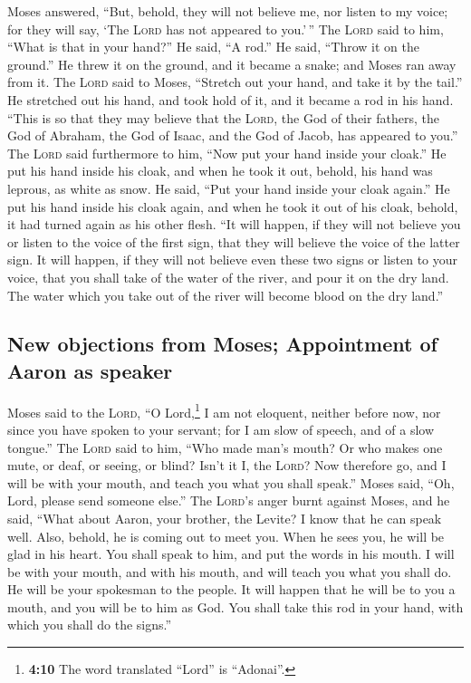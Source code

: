  Moses answered, ``But, behold, they will not believe me,
nor listen to my voice; for they will say, `The \textsc{Lord} has not
appeared to you.'\,''  The \textsc{Lord} said to him,
``What is that in your hand?'' He said, ``A rod.''  He
said, ``Throw it on the ground.'' He threw it on the ground, and it
became a snake; and Moses ran away from it.  The
\textsc{Lord} said to Moses, ``Stretch out your hand, and take it by the
tail.'' He stretched out his hand, and took hold of it, and it became a
rod in his hand.  ``This is so that they may believe that
the \textsc{Lord}, the God of their fathers, the God of Abraham, the God
of Isaac, and the God of Jacob, has appeared to you.'' 
The \textsc{Lord} said furthermore to him, ``Now put your hand inside
your cloak.'' He put his hand inside his cloak, and when he took it out,
behold, his hand was leprous, as white as snow.  He said,
``Put your hand inside your cloak again.'' He put his hand inside his
cloak again, and when he took it out of his cloak, behold, it had turned
again as his other flesh.  ``It will happen, if they will
not believe you or listen to the voice of the first sign, that they will
believe the voice of the latter sign.  It will happen, if
they will not believe even these two signs or listen to your voice, that
you shall take of the water of the river, and pour it on the dry land.
The water which you take out of the river will become blood on the dry
land.''

\hypertarget{new-objections-from-moses-appointment-of-aaron-as-speaker}{%
\subsection{New objections from Moses; Appointment of Aaron as
speaker}\label{new-objections-from-moses-appointment-of-aaron-as-speaker}}

 Moses said to the \textsc{Lord}, ``O Lord,\footnote{\textbf{4:10}
  The word translated ``Lord'' is ``Adonai''.} I am not eloquent,
neither before now, nor since you have spoken to your servant; for I am
slow of speech, and of a slow tongue.''  The
\textsc{Lord} said to him, ``Who made man's mouth? Or who makes one
mute, or deaf, or seeing, or blind? Isn't it I, the \textsc{Lord}?
 Now therefore go, and I will be with your mouth, and
teach you what you shall speak.''  Moses said, ``Oh,
Lord, please send someone else.''  The \textsc{Lord}'s
anger burnt against Moses, and he said, ``What about Aaron, your
brother, the Levite? I know that he can speak well. Also, behold, he is
coming out to meet you. When he sees you, he will be glad in his heart.
 You shall speak to him, and put the words in his mouth.
I will be with your mouth, and with his mouth, and will teach you what
you shall do.  He will be your spokesman to the people.
It will happen that he will be to you a mouth, and you will be to him as
God.  You shall take this rod in your hand, with which
you shall do the signs.''

